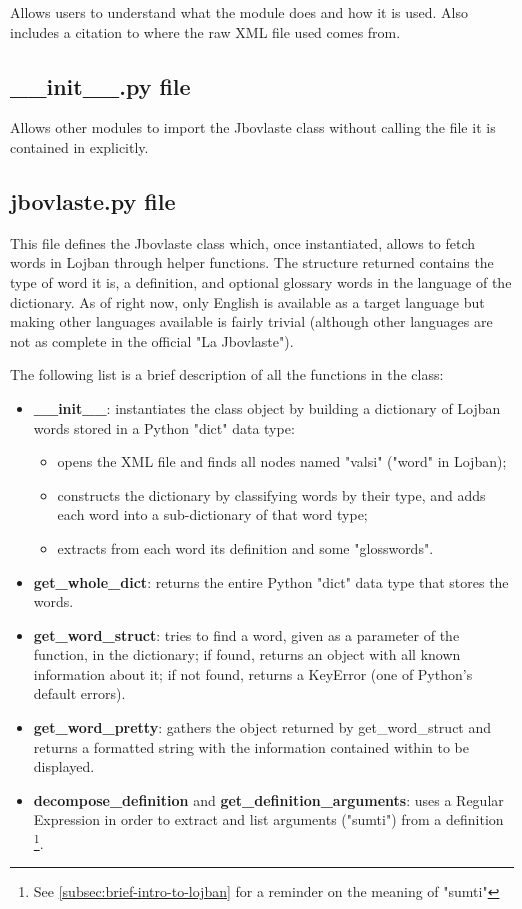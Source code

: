 Allows users to understand what the module does and how it is used.
Also includes a citation to where the raw XML file used comes from.

\subsection*{\_\_init\_\_.py file}

Allows other modules to import the Jbovlaste class without calling the file it is contained in explicitly.

\subsection*{jbovlaste.py file}

This file defines the Jbovlaste class which, once instantiated, allows to fetch
words in Lojban through helper functions. The structure returned contains the type of word it is,
a definition, and optional glossary words in the language of the dictionary.
As of right now, only English is available as a target language but making other
languages available is fairly trivial (although other languages are not as complete
in the official "La Jbovlaste").\newline

\newpage

The following list is a brief description of all the
functions in the class:

\begin{itemize}
\item \textbf{\_\_init\_\_}: instantiates the class object by building a dictionary of
Lojban words stored in a Python "dict" data type:
  \begin{itemize}
    \item opens the XML file and finds all nodes named "valsi" ("word" in Lojban);
    \item constructs the dictionary by classifying words by their type, and adds
    each word into a sub-dictionary of that word type;
    \item extracts from each word its definition and some "glosswords".
  \end{itemize}
\item \textbf{get\_whole\_dict}: returns the entire Python "dict" data type that stores
the words.
\item \textbf{get\_word\_struct}: tries to find a word, given as a parameter of the function,
in the dictionary; if found, returns an object with all known information about it;
if not found, returns a KeyError (one of Python's default errors).
\item \textbf{get\_word\_pretty}: gathers the object returned by get\_word\_struct and returns
a formatted string with the information contained within to be displayed.
\item \textbf{decompose\_definition} and \textbf{get\_definition\_arguments}: uses a Regular Expression
in order to extract and list arguments ("sumti") from a definition
\footnote{See \ref{subsec:brief-intro-to-lojban} for a reminder on the meaning of "sumti"}.
\end{itemize}

